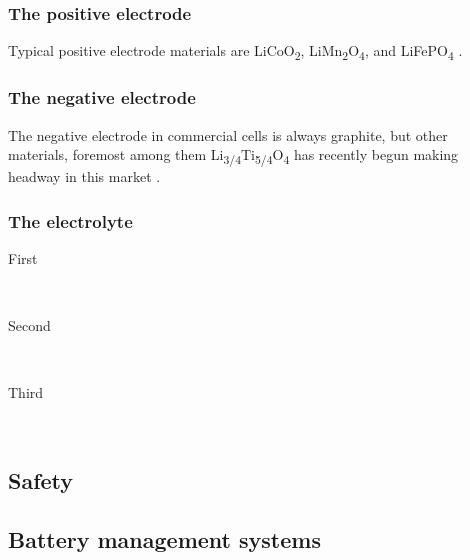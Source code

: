 \documentclass[12pt]{article} %
\begin{document}
\subsubsection{The positive electrode} %

Typical positive electrode materials are LiCoO\textsubscript{2}, LiMn\textsubscript{2}O\textsubscript{4}, and LiFePO\textsubscript{4} \cite{kulova_new_2013}.


\subsubsection{The negative electrode} %

The negative electrode in commercial cells is always graphite, but other materials, foremost among them Li\textsubscript{3/4}Ti\textsubscript{5/4}O\textsubscript{4} has recently begun making headway in this market \cite{kulova_new_2013}.


\subsubsection{The electrolyte} %

\begin{description} %

\item[First] \hfill \\
\lipsum[9] %

\item[Second] \hfill \\
\lipsum[10] %

\item[Third] \hfill \\
\lipsum[11] %

\end{description} 


\subsection{Safety}


\subsection{Battery management systems}
\end{document}

